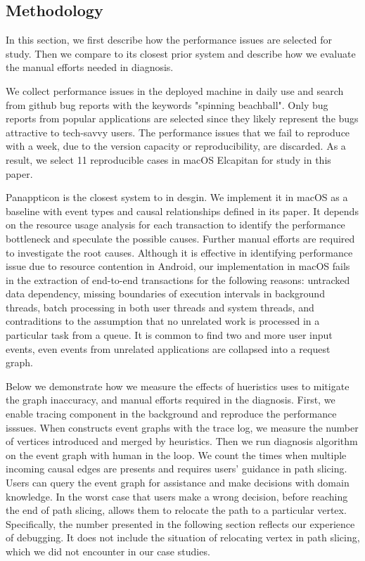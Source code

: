 \subsection{Methodology} \label{sec:methodology}

In this section, we first describe how the performance issues are selected for
study. Then we compare \xxx to its closest prior system and describe how we
evaluate the manual efforts needed in diagnosis.

We collect performance issues in the deployed machine in daily use and search
from github bug reports with the keywords "spinning beachball". Only bug
reports from popular applications are selected since they likely represent the
bugs attractive to tech-savvy users. The performance issues that we fail to
reproduce with a week, due to the version capacity or reproducibility, are
discarded. As a result, we select 11 reproducible cases in macOS Elcapitan for
study in this paper.


Panappticon is the closest system to \xxx in desgin. We implement it in macOS
as a baseline with event types and causal relationships defined in its paper.
It depends on the resource usage analysis for each transaction to identify
the performance bottleneck and speculate the possible causes. Further manual
efforts are required to investigate the root causes. Although it is effective
in identifying performance issue due to resource contention in Android, our
implementation in macOS fails in the extraction of end-to-end transactions
for the following reasons: untracked data dependency, missing boundaries of
execution intervals in background threads, batch processing in both user threads
and system threads, and contraditions to the assumption that no unrelated work
is processed in a particular task from a queue. It is common to find two and
more user input events, even events from unrelated applications are collapsed
into a request graph.

Below we demonstrate how we measure the effects of hueristics \xxx uses to
mitigate the graph inaccuracy, and manual efforts required in the diagnosis.
First, we enable tracing component in the background and reproduce the
performance isssues.  When \xxx constructs event graphs with the trace log, we
measure the number of vertices introduced and merged by heuristics.  Then we
run \xxx diagnosis algorithm on the event graph with human in the loop. We
count the times when multiple incoming causal edges are presents and \xxx
requires users' guidance in path slicing. Users can query the event graph for
assistance and make decisions with domain knowledge. In the worst case that
users make a wrong decision, before reaching the end of path slicing, \xxx
allows them to relocate the path to a particular vertex. Specifically, the
number presented in the following section reflects our experience of debugging.
It does not include the situation of relocating vertex in path slicing, which
we did not encounter in our case studies.
